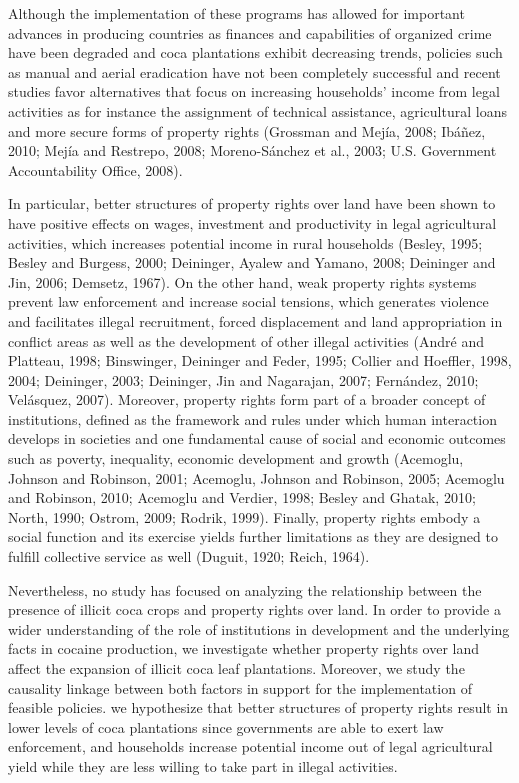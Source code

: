 Although the implementation of these programs has allowed for important advances in producing countries as finances and capabilities of organized crime have been degraded and coca plantations exhibit decreasing trends, policies such as manual and aerial eradication have not been completely successful and recent studies favor alternatives that focus on increasing households' income from legal activities as for instance the assignment of technical assistance, agricultural loans and more secure forms of property rights (Grossman and Mej\'{i}a, 2008; Ib\'{a}\~{n}ez, 2010; Mej\'{i}a and Restrepo, 2008; Moreno-S\'{a}nchez et al., 2003; U.S. Government Accountability Office, 2008).  

In particular, better structures of property rights over land have been shown to have positive effects on wages, investment and productivity in legal agricultural activities, which increases potential income in rural households (Besley, 1995; Besley and Burgess, 2000; Deininger, Ayalew and Yamano, 2008; Deininger and Jin, 2006; Demsetz, 1967). On the other hand, weak property rights systems prevent law enforcement and increase social tensions, which generates violence and facilitates illegal recruitment, forced displacement and land appropriation in conflict areas as well as the development of other illegal activities (Andr\'{e} and Platteau, 1998; Binswinger, Deininger and Feder, 1995; Collier and Hoeffler, 1998, 2004; Deininger, 2003; Deininger, Jin and Nagarajan, 2007; Fern\'{a}ndez, 2010; Vel\'{a}squez, 2007). Moreover, property rights form part of a broader concept of institutions, defined as the framework and rules under which human interaction develops in societies and one fundamental cause of social and economic outcomes such as poverty, inequality, economic development and growth (Acemoglu, Johnson and Robinson, 2001; Acemoglu, Johnson and Robinson, 2005; Acemoglu and Robinson, 2010; Acemoglu and Verdier, 1998; Besley and Ghatak, 2010; North, 1990; Ostrom, 2009; Rodrik, 1999). Finally, property rights embody a social function and its exercise yields further limitations as they are designed to fulfill collective service as well (Duguit, 1920; Reich, 1964).

Nevertheless, no study has focused on analyzing the relationship between the presence of illicit coca crops and property rights over land. In order to provide a wider understanding of the role of institutions in development and the underlying facts in cocaine production, we investigate whether property rights over land affect the expansion of illicit coca leaf plantations. Moreover, we study the causality linkage between both factors in support for the implementation of feasible policies. we hypothesize that better structures of property rights result in lower levels of coca plantations since governments are able to exert law enforcement, and households increase potential income out of legal agricultural yield while they are less willing to take part in illegal activities.

